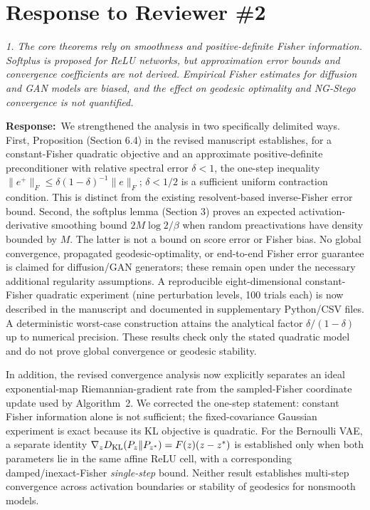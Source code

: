 \documentclass[12pt,a4paper]{article}
\newcommand{\revcomment}[1]{\par\medskip\noindent\colorbox{gray!15}{\parbox{\dimexpr\linewidth-2\fboxsep}{\itshape #1}}\par\medskip}
\newcommand{\ourresponse}{\noindent\textbf{Response:}\ }
\begin{document}
\section*{Response to Reviewer \#2}

\revcomment{1. The core theorems rely on smoothness and positive-definite Fisher information. Softplus is proposed for ReLU networks, but approximation error bounds and convergence coefficients are not derived. Empirical Fisher estimates for diffusion and GAN models are biased, and the effect on geodesic optimality and NG-Stego convergence is not quantified.}

\ourresponse We strengthened the analysis in two specifically delimited ways. First, Proposition (Section 6.4) in the revised manuscript establishes, for a constant-Fisher quadratic objective and an approximate positive-definite preconditioner with relative spectral error $\delta<1$, the one-step inequality $\|e^+\|_F\le\delta(1-\delta)^{-1}\|e\|_F$; $\delta<1/2$ is a sufficient uniform contraction condition. This is distinct from the existing resolvent-based inverse-Fisher error bound. Second, the softplus lemma (Section 3) proves an expected activation-derivative smoothing bound $2M\log 2/\beta$ when random preactivations have density bounded by $M$. The latter is not a bound on score error or Fisher bias. No global convergence, propagated geodesic-optimality, or end-to-end Fisher error guarantee is claimed for diffusion/GAN generators; these remain open under the necessary additional regularity assumptions. A reproducible eight-dimensional constant-Fisher quadratic experiment (nine perturbation levels, 100 trials each) is now described in the manuscript and documented in supplementary Python/CSV files. A deterministic worst-case construction attains the analytical factor $\delta/(1-\delta)$ up to numerical precision. These results check only the stated quadratic model and do not prove global convergence or geodesic stability.

In addition, the revised convergence analysis now explicitly separates an
ideal exponential-map Riemannian-gradient rate from the sampled-Fisher
coordinate update used by Algorithm~2. We corrected the one-step statement:
constant Fisher information alone is not sufficient; the fixed-covariance
Gaussian experiment is exact because its KL objective is quadratic. For
the Bernoulli VAE, a separate identity
$\nabla_z D_{\rm KL}(P_z\|P_{z^*})=F(z)(z-z^*)$
is established only when both parameters lie in the same affine ReLU cell,
with a corresponding damped/inexact-Fisher \emph{single-step} bound.
Neither result establishes multi-step convergence across activation
boundaries or stability of geodesics for nonsmooth models.
\end{document}
